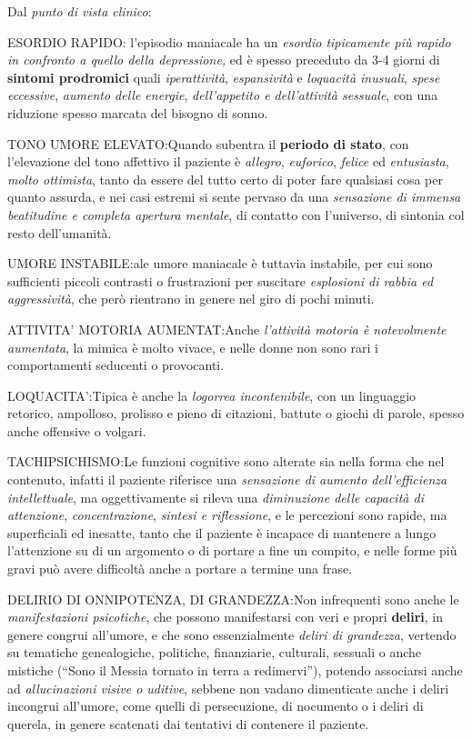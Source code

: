 \documentclass[]{article}
\begin{document}
Dal \emph{punto di vista clinico}:

ESORDIO RAPIDO: l'episodio maniacale ha un \emph{esordio tipicamente più
rapido in confronto a quello della depressione,} ed è spesso preceduto
da 3-4 giorni di \textbf{sintomi prodromici} quali \emph{iperattività},
\emph{espansività} e \emph{loquacità inusuali}, \emph{spese eccessive},
\emph{aumento delle energie}, \emph{dell'appetito e dell'attività
sessuale}, con una riduzione spesso marcata del bisogno di sonno.

TONO UMORE ELEVATO:Quando subentra il \textbf{periodo di stato}, con
l'elevazione del tono affettivo il paziente è \emph{allegro},
\emph{euforico}, \emph{felice} ed \emph{entusiasta}, \emph{molto
ottimista}, tanto da essere del tutto certo di poter fare qualsiasi cosa
per quanto assurda, e nei casi estremi si sente pervaso da una
\emph{sensazione di immensa beatitudine e completa apertura mentale}, di
contatto con l'universo, di sintonia col resto dell'umanità.

UMORE INSTABILE:ale umore maniacale è tuttavia instabile, per cui sono
sufficienti piccoli contrasti o frustrazioni per suscitare
\emph{esplosioni di rabbia ed aggressività}, che però rientrano in
genere nel giro di pochi minuti.

ATTIVITA' MOTORIA AUMENTAT:Anche \emph{l'attività motoria è notevolmente
aumentata}, la mimica è molto vivace, e nelle donne non sono rari i
comportamenti seducenti o provocanti.

LOQUACITA':Tipica è anche la \emph{logorrea incontenibile}, con un
linguaggio retorico, ampolloso, prolisso e pieno di citazioni, battute o
giochi di parole, spesso anche offensive o volgari.

TACHIPSICHISMO:Le funzioni cognitive sono alterate sia nella forma che
nel contenuto, infatti il paziente riferisce una \emph{sensazione di
aumento dell'efficienza intellettuale}, ma oggettivamente si rileva una
\emph{diminuzione delle capacità di attenzione}, \emph{concentrazione},
\emph{sintesi e riflessione}, e le percezioni sono rapide, ma
superficiali ed inesatte, tanto che il paziente è incapace di mantenere
a lungo l'attenzione su di un argomento o di portare a fine un compito,
e nelle forme più gravi può avere difficoltà anche a portare a termine
una frase.

DELIRIO DI ONNIPOTENZA, DI GRANDEZZA:Non infrequenti sono anche le
\emph{manifestazioni psicotiche}, che possono manifestarsi con veri e
propri \textbf{deliri}, in genere congrui all'umore, e che sono
essenzialmente \emph{deliri di grandezza}, vertendo su tematiche
genealogiche, politiche, finanziarie, culturali, sessuali o anche
mistiche (``Sono il Messia tornato in terra a redimervi''), potendo
associarsi anche ad \emph{allucinazioni visive o uditive}, sebbene non
vadano dimenticate anche i deliri incongrui all'umore, come quelli di
persecuzione, di nocumento o i deliri di querela, in genere scatenati
dai tentativi di contenere il paziente.
\end{document}

